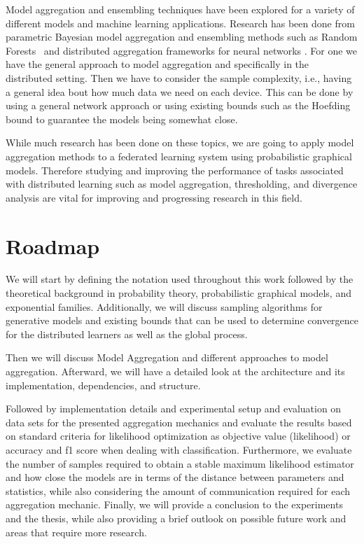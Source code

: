 Model aggregation and ensembling techniques have been explored for a variety of different models and machine learning applications.
Research has been done from parametric Bayesian model aggregation \cite{hoeting1999bayesian}\cite{de2011bayesian} and ensembling methods such as Random Forests~\cite{breiman2001random} and distributed aggregation frameworks for neural networks \cite{mcmahan2016communication}.
For one we have the general approach to model aggregation and specifically in the distributed setting.
Then we have to consider the sample complexity, i.e., having a general idea bout how much data we need on each device.
This can be done by using a general network approach or using existing bounds such as the Hoefding bound to guarantee the models being somewhat close.

While much research has been done on these topics, we are going to apply model aggregation methods to a federated learning system using probabilistic graphical models.
Therefore studying and improving the performance of tasks associated with distributed learning such as model aggregation, thresholding, and divergence analysis are vital for improving and progressing research in this field.

\section{Roadmap}

We will start by defining the notation used throughout this work followed by the theoretical background in probability theory, probabilistic graphical models, and exponential families.
Additionally, we will discuss sampling algorithms for generative models and existing bounds that can be used to determine convergence for the distributed learners as well as the global process.

Then we will discuss Model Aggregation and different approaches to model aggregation. 
Afterward, we will have a detailed look at the architecture and its implementation, dependencies, and structure.

Followed by implementation details and experimental setup and evaluation on data sets for the presented aggregation mechanics and evaluate the results based on standard criteria for likelihood optimization as objective value (likelihood) or accuracy and f1 score when dealing with classification. 
Furthermore, we evaluate the number of samples required to obtain a stable maximum likelihood estimator and how close the models are in terms of the distance between parameters and statistics, while also considering the amount of communication required for each aggregation mechanic.
Finally, we will provide a conclusion to the experiments and the thesis, while also providing a brief outlook on possible future work and areas that require more research.
